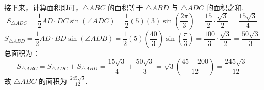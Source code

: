 \begin{solution}
	接下来，计算面积即可，$\triangle ABC$ 的面积等于 $\triangle ABD$ 与 $\triangle ADC$ 的面积之和.
	\[
	S_{\triangle ADC} = \frac{1}{2}AD \cdot DC \sin(\angle ADC) = \frac{1}{2}(5)(3)\sin\left(\frac{2\pi}{3}\right) = \frac{15}{2} \cdot \frac{\sqrt{3}}{2} = \frac{15\sqrt{3}}{4}
	\]
	\[
	S_{\triangle ABD} = \frac{1}{2}AD \cdot BD \sin(\angle ADB) = \frac{1}{2}(5)\left(\frac{40}{3}\right)\sin\left(\frac{\pi}{3}\right) = \frac{100}{3} \cdot \frac{\sqrt{3}}{2} = \frac{50\sqrt{3}}{3}
	\]
	总面积为：
	\[
	S_{\triangle ABC} = S_{\triangle ADC} + S_{\triangle ABD} = \frac{15\sqrt{3}}{4} + \frac{50\sqrt{3}}{3} = \sqrt{3}\left(\frac{45+200}{12}\right) = \frac{245\sqrt{3}}{12}
	\]
	故 $\triangle ABC$ 的面积为 $\frac{245\sqrt{3}}{12}$.\hfill\qedsymbol
\end{solution}